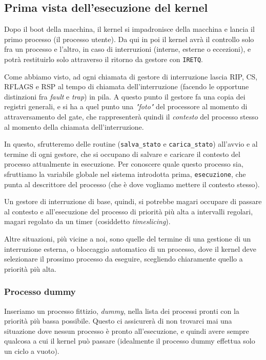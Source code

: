 \documentclass[a4paper,11pt]{article}
\begin{document}
\subsection{Prima vista dell'esecuzione del kernel}
Dopo il boot della macchina, il kernel si impadronisce della macchina e lancia il primo processo (il processo utente).
Da qui in poi il kernel avrà il controllo solo fra un processo e l'altro, in caso di interruzioni (interne, esterne o eccezioni), e potrà restituirlo solo attraverso il ritorno da gestore con \lstinline|IRETQ|.

Come abbiamo visto, ad ogni chiamata di gestore di interruzione lascia RIP, CS, RFLAGS e RSP al tempo di chiamata dell'interruzione (facendo le opportune distinzioni fra \textit{fault} e \textit{trap}) in pila.
A questo punto il gestore fa una copia dei registri generali, e si ha a quel punto una \textit{"foto"} del processore al momento di attraversamento del gate, che rappresenterà quindi il \textit{contesto} del processo stesso al momento della chiamata dell'interruzione.

In questo, sfrutteremo delle routine (\lstinline|salva_stato| e \lstinline|carica_stato|) all'avvio e al termine di ogni gestore, che si occupano di salvare e caricare il contesto del processo attualmente in esecuzione.
Per conoscere quale questo processo sia, sfruttiamo la variabile globale nel sistema introdotta prima, \lstinline|esecuzione|, che punta al descrittore del processo (che è dove vogliamo mettere il contesto stesso).

Un gestore di interruzione di base, quindi, si potrebbe magari occupare di passare al contesto e all'esecuzione del processo di priorità più alta a intervalli regolari, magari regolato da un timer (cosiddetto \textit{timeslicing}).

Altre situazioni, più vicine a noi, sono quelle del termine di una gestione di un interruzione esterna, o bloccaggio automatico di un processo, dove il kernel deve selezionare il prossimo processo da eseguire, scegliendo chiaramente quello a priorità più alta.

\subsubsection{Processo dummy}
Inseriamo un processo fittizio, \textit{dummy}, nella lista dei processi pronti con la priorità più bassa possibile.
Questo ci assicurerà di non trovarci mai una situazione dove nessun processo è pronto all'esecuzione, e quindi avere sempre qualcosa a cui il kernel può passare (idealmente il processo dummy effettua solo un ciclo a vuoto).
\end{document}
